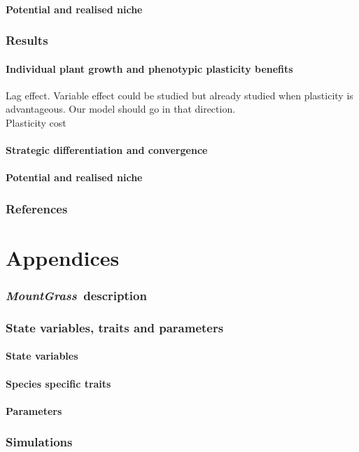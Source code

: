 \documentclass[review]{elsarticle}
\newcommand{\model}{\textbf{\textit{MountGrass}}~}
\begin{document}
\subsection{Potential and realised niche}

\section{Results}
\subsection{Individual plant growth and phenotypic plasticity benefits}
Lag effect. Variable effect could be studied but already studied when plasticity is advantageous. Our model should go in that direction.\\
Plasticity cost\\

\subsection{Strategic differentiation and convergence}

\subsection{Potential and realised niche}


\section*{References}
\cite{Dirac1953888}


\part*{Appendices}


\section{\model description}

\section{State variables, traits and parameters}
\subsection{State variables}
\subsection{Species specific traits}
\subsection{Parameters}

\section{Simulations}
\end{document}
